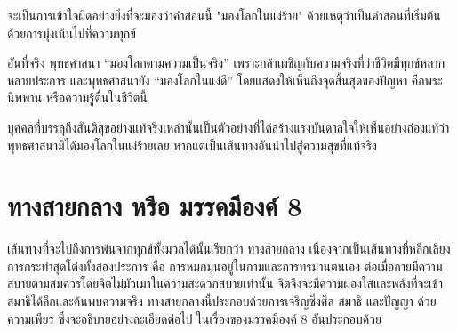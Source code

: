 \documentclass[12pt, openany]{book}
\begin{document}
จะ{\wbr}เป็น{\wbr}การ{\wbr}เข้าใจ{\wbr}ผิด{\wbr}อย่าง{\wbr}ยิ่ง{\wbr}ที่{\wbr}จะ{\wbr}มอง{\wbr}ว่า{\wbr}คำ{\wbr}สอน{\wbr}นี้ "มอง{\wbr}โลก{\wbr}ใน{\wbr}แง่{\wbr}ร้าย" ด้วย{\wbr}เหตุ{\wbr}ว่า{\wbr}เป็น{\wbr}คำ{\wbr}สอน{\wbr}ที่{\wbr}เริ่มต้น{\wbr}ด้วย{\wbr}การ{\wbr}มุ่ง{\wbr}เน้น{\wbr}ไป{\wbr}ที่{\wbr}ความ{\wbr}ทุกข์  

อัน{\wbr}ที่{\wbr}จริง พุทธ{\wbr}ศาสนา “มอง{\wbr}โลก{\wbr}ตาม{\wbr}ความ{\wbr}เป็น{\wbr}จริง” เพราะ{\wbr}กล้า{\wbr}เผชิญ{\wbr}กับ{\wbr}ความ{\wbr}จริง{\wbr}ที่{\wbr}ว่า{\wbr}ชีวิต{\wbr}มี{\wbr}ทุกข์{\wbr}หลากหลาย{\wbr}ประการ และ{\wbr}พุทธ{\wbr}ศาสนา{\wbr}ยัง “มอง{\wbr}โลก{\wbr}ใน{\wbr}แง่{\wbr}ดี” โดย{\wbr}แสดง{\wbr}ให้{\wbr}เห็น{\wbr}ถึง{\wbr}จุด{\wbr}สิ้นสุด{\wbr}ของ{\wbr}ปัญหา คือ{\wbr}พระ{\wbr}นิพพาน หรือ{\wbr}ความ{\wbr}รู้{\wbr}ตื่น{\wbr}ใน{\wbr}ชีวิต{\wbr}นี้  

บุคคล{\wbr}ที่{\wbr}บรรลุ{\wbr}ถึง{\wbr}สันติสุข{\wbr}อย่าง{\wbr}แท้{\wbr}จริง{\wbr}เหล่า{\wbr}นั้น{\wbr}เป็น{\wbr}ตัวอย่าง{\wbr}ที่{\wbr}ได้{\wbr}สร้าง{\wbr}แรง{\wbr}บันดาล{\wbr}ใจ{\wbr}ให้{\wbr}เห็น{\wbr}อย่าง{\wbr}ถ่องแท้{\wbr}ว่า พุทธ{\wbr}ศาสนา{\wbr}มิ{\wbr}ได้{\wbr}มอง{\wbr}โลก{\wbr}ใน{\wbr}แง่{\wbr}ร้าย{\wbr}เลย หาก{\wbr}แต่{\wbr}เป็น{\wbr}เส้นทาง{\wbr}อัน{\wbr}นำ{\wbr}ไป{\wbr}สู่{\wbr}ความ{\wbr}สุข{\wbr}ที่{\wbr}แท้{\wbr}จริง{\wbr}

\section{ทาง{\wbr}สาย{\wbr}กลาง หรือ มรรค{\wbr}มี{\wbr}องค์ 8}


เส้นทาง{\wbr}ที่{\wbr}จะ{\wbr}ไป{\wbr}ถึง{\wbr}การ{\wbr}พ้น{\wbr}จาก{\wbr}ทุกข์{\wbr}ทั้งมวล{\wbr}ได้{\wbr}นั้น{\wbr}เรียก{\wbr}ว่า ทาง{\wbr}สาย{\wbr}กลาง เนื่อง{\wbr}จาก{\wbr}เป็น{\wbr}เส้นทาง{\wbr}ที่{\wbr}หลีก{\wbr}เลี่ยง{\wbr}การ{\wbr}กระทำ{\wbr}สุด{\wbr}โต่ง{\wbr}ทั้ง{\wbr}สอง{\wbr}ประการ คือ การ{\wbr}หมกมุ่น{\wbr}อยู่{\wbr}ใน{\wbr}กาม{\wbr}และ{\wbr}การ{\wbr}ทรมาน{\wbr}ตนเอง  ต่อ{\wbr}เมื่อ{\wbr}กาย{\wbr}มี{\wbr}ความ{\wbr}สบาย{\wbr}ตาม{\wbr}สมควร{\wbr}โดย{\wbr}จิต{\wbr}ไม่{\wbr}มัวเมา{\wbr}ใน{\wbr}ความ{\wbr}สะดวก{\wbr}สบาย{\wbr}เท่านั้น จิต{\wbr}จึง{\wbr}จะ{\wbr}มี{\wbr}ความ{\wbr}ผ่องใส{\wbr}และ{\wbr}พลัง{\wbr}ที่{\wbr}จะ{\wbr}เข้า{\wbr}สมาธิ{\wbr}ได้{\wbr}ลึก{\wbr}และ{\wbr}ค้น{\wbr}พบ{\wbr}ความ{\wbr}จริง  ทาง{\wbr}สาย{\wbr}กลาง{\wbr}นี้{\wbr}ประกอบ{\wbr}ด้วย{\wbr}การ{\wbr}เจริญ{\wbr}ซึ่ง{\wbr}ศีล สมาธิ และ{\wbr}ปัญญา ด้วย{\wbr}ความ{\wbr}เพียร ซึ่ง{\wbr}จะ{\wbr}อธิบาย{\wbr}อย่าง{\wbr}ละเอียด{\wbr}ต่อ{\wbr}ไป ใน{\wbr}เรื่อง{\wbr}ของ{\wbr}มรรค{\wbr}มี{\wbr}องค์ 8 อัน{\wbr}ประกอบ{\wbr}ด้วย{\wbr}
\end{document}
